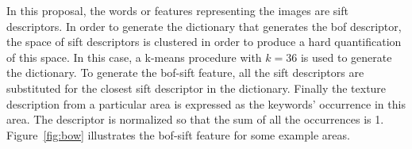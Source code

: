 \documentclass[a4paper, 10pt, conference]{llncs}      %
\begin{document}
In this proposal, the words or features representing the images are \ac{sift} descriptors. In order to generate the dictionary that generates the \ac{bof} descriptor, the space of \ac{sift} descriptors is clustered in order to produce a hard quantification of this space. In this case, a k-means procedure with $k=36$ is used to generate the dictionary. To generate the \ac{bof}-\ac{sift} feature, all the \ac{sift} descriptors are substituted for the closest \ac{sift} descriptor in the dictionary. Finally the texture description from a particular area is expressed as the keywords' occurrence in this area. The descriptor is normalized so that the sum of all the occurrences is 1. 
Figure~\ref{fig:bow} illustrates the \ac{bof}-\ac{sift} feature for some example areas. %


\end{document}
